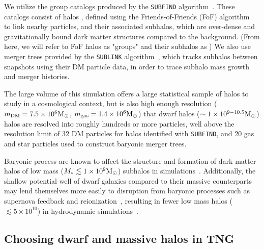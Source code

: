 \documentclass[twocolumn]{aastex631}
\begin{document}
    We utilize the group catalogs produced by the \texttt{SUBFIND} algorithm~\citep{springel2001,dolag09}. 
    These catalogs consist of halos , defined using the Friends-of-Friends (FoF) algorithm~\citep{davis1985} to link nearby particles, and their associated subhalos, which are over-dense and gravitationally bound dark matter structures compared to the background. (From here, we will refer to FoF halos as "groups" and their subhalos as )
    We also use merger trees provided by the \texttt{SUBLINK} algorithm~\citep{RG2015}, which tracks subhalos between snapshots using their DM particle data, in order to trace subhalo mass growth and merger histories.
    
    The large volume of this simulation offers a large statistical sample of halos to study in a cosmological context, but is also high enough resolution ($m_{\rm DM} = 7.5\times10^6\mathrm{M}_\odot$, $m_{\rm gas} = 1.4\times10^6\mathrm{M}_\odot$) that dwarf halos ($\sim1\times10^{9-10.5}\mathrm{M}_\odot$) halos are resolved into roughly hundreds or more particles, well above the resolution limit of 32 DM particles for halos identified with \texttt{SUBFIND}, and 20 gas and star particles used to construct baryonic merger trees.  

    Baryonic process are known to affect the structure and formation of dark matter halos of low mass ($M_*\lesssim 1\times10^9\mathrm{M}_\odot$) subhalos in simulations~\citep[see e.g.][and references therein]{Sales:2022}.
    Additionally, the shallow potential well of dwarf galaxies compared to their massive counterparts may lend themselves more easily to disruption from baryonic processes such as supernova feedback and reionization~\citep{}, resulting in fewer low mass halos ($\lesssim 5\times10^{10}$) in hydrodynamic simulations~\citep{vogelsberger14B}.

    
    
      



        
    
\subsection{Choosing dwarf and massive halos in TNG} \label{sec:methods-halos}
    
\end{document}
